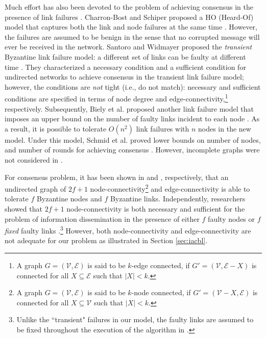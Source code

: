 \documentclass{llncs}
\newcommand{\scripte}{\mathcal{E}}
\newcommand{\scriptv}{\mathcal{V}}
\begin{document}
Much effort has also been devoted to the problem of achieving consensus in the presence of link failures \cite{HeardOf,Biely_hybrid,Schmid_link,Santoro_link,Santoro_link2}. Charron-Bost and Schiper proposed a HO (Heard-Of) model that captures both the link and node failures at the same time \cite{HeardOf}. However, the failures are assumed to be benign in the sense that no corrupted message will ever be received in the network. Santoro and Widmayer proposed the {\em transient} Byzantine link failure model: a different set of links can be faulty at different time \cite{Santoro_link,Santoro_link2}. They characterized a necessary condition and a sufficient condition for undirected networks to achieve consensus in the transient link failure model; however, the conditions are {\em not} tight (i.e., do not match): necessary and sufficient conditions are specified in terms of node degree and edge-connectivity,\footnote{A graph $G=(\scriptv, \scripte)$ is said to be $k$-edge connected, if $G'=(\scriptv, \scripte - X)$ is connected for all $X \subseteq \scripte$ such that $|X| < k$.} respectively. Subsequently, Biely et al. proposed another link failure model that imposes an upper bound on the number of faulty links incident to each node \cite{Biely_hybrid}. As a result, it is possible to tolerate $O(n^2)$ link failures with $n$ nodes in the new model. Under this model, Schmid et al. proved lower bounds on number of nodes, and number of rounds for achieving consensus \cite{Schmid_link}. However, incomplete graphs were not considered in \cite{Biely_hybrid,Schmid_link}.

For consensus problem, it has been shown in \cite{impossible} and \cite{Santoro_link2}, respectively, that an undirected graph of $2f+1$ node-connectivity\footnote{A graph $G=(\scriptv, \scripte)$ is said to be $k$-node connected, if $G'=(\scriptv - X, \scripte)$ is connected for all $X \subseteq \scriptv$ such that $|X| < k$.} and edge-connectivity is able to tolerate $f$ Byzantine nodes and $f$ Byzantine links. Independently, researchers showed that $2f+1$ node-connectivity is both necessary and sufficient for the problem of information dissemination in the presence of either $f$ faulty nodes \cite{SS_node} or $f$ {\em fixed} faulty links \cite{SS_link}.\footnote{Unlike the ``transient" failures in our model, the faulty links are assumed to be fixed throughout the execution of the algorithm in \cite{SS_link}.} However, both node-connectivity and edge-connectivity are not adequate for our problem as illustrated in Section \ref{sec:iacbl}. 
\end{document}
